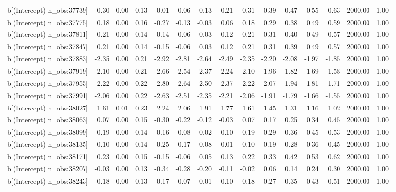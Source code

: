 \begin{table}[ht]
\begin{tabular}{rrrrrrrrrrrrrrr}
  b[(Intercept) n\_obs:37739] & 0.30 & 0.00 & 0.13 & -0.01 & 0.06 & 0.13 & 0.21 & 0.31 & 0.39 & 0.47 & 0.55 & 0.63 & 2000.00 & 1.00 \\ 
  b[(Intercept) n\_obs:37775] & 0.18 & 0.00 & 0.16 & -0.27 & -0.13 & -0.03 & 0.06 & 0.18 & 0.29 & 0.38 & 0.49 & 0.59 & 2000.00 & 1.00 \\ 
  b[(Intercept) n\_obs:37811] & 0.21 & 0.00 & 0.14 & -0.14 & -0.06 & 0.03 & 0.12 & 0.21 & 0.31 & 0.40 & 0.49 & 0.57 & 2000.00 & 1.00 \\ 
  b[(Intercept) n\_obs:37847] & 0.21 & 0.00 & 0.14 & -0.15 & -0.06 & 0.03 & 0.12 & 0.21 & 0.31 & 0.39 & 0.49 & 0.57 & 2000.00 & 1.00 \\ 
  b[(Intercept) n\_obs:37883] & -2.35 & 0.00 & 0.21 & -2.92 & -2.81 & -2.64 & -2.49 & -2.35 & -2.20 & -2.08 & -1.97 & -1.85 & 2000.00 & 1.00 \\ 
  b[(Intercept) n\_obs:37919] & -2.10 & 0.00 & 0.21 & -2.66 & -2.54 & -2.37 & -2.24 & -2.10 & -1.96 & -1.82 & -1.69 & -1.58 & 2000.00 & 1.00 \\ 
  b[(Intercept) n\_obs:37955] & -2.22 & 0.00 & 0.22 & -2.80 & -2.64 & -2.50 & -2.37 & -2.22 & -2.07 & -1.94 & -1.81 & -1.71 & 2000.00 & 1.00 \\ 
  b[(Intercept) n\_obs:37991] & -2.06 & 0.00 & 0.22 & -2.63 & -2.51 & -2.35 & -2.21 & -2.06 & -1.91 & -1.79 & -1.66 & -1.55 & 2000.00 & 1.00 \\ 
  b[(Intercept) n\_obs:38027] & -1.61 & 0.01 & 0.23 & -2.24 & -2.06 & -1.91 & -1.77 & -1.61 & -1.45 & -1.31 & -1.16 & -1.02 & 2000.00 & 1.00 \\ 
  b[(Intercept) n\_obs:38063] & 0.07 & 0.00 & 0.15 & -0.30 & -0.22 & -0.12 & -0.03 & 0.07 & 0.17 & 0.25 & 0.34 & 0.45 & 2000.00 & 1.00 \\ 
  b[(Intercept) n\_obs:38099] & 0.19 & 0.00 & 0.14 & -0.16 & -0.08 & 0.02 & 0.10 & 0.19 & 0.29 & 0.36 & 0.45 & 0.53 & 2000.00 & 1.00 \\ 
  b[(Intercept) n\_obs:38135] & 0.10 & 0.00 & 0.14 & -0.25 & -0.17 & -0.08 & 0.01 & 0.10 & 0.19 & 0.28 & 0.36 & 0.45 & 2000.00 & 1.00 \\ 
  b[(Intercept) n\_obs:38171] & 0.23 & 0.00 & 0.15 & -0.15 & -0.06 & 0.05 & 0.13 & 0.22 & 0.33 & 0.42 & 0.53 & 0.62 & 2000.00 & 1.00 \\ 
  b[(Intercept) n\_obs:38207] & -0.03 & 0.00 & 0.13 & -0.34 & -0.28 & -0.20 & -0.11 & -0.02 & 0.06 & 0.14 & 0.24 & 0.30 & 2000.00 & 1.00 \\ 
  b[(Intercept) n\_obs:38243] & 0.18 & 0.00 & 0.13 & -0.17 & -0.07 & 0.01 & 0.10 & 0.18 & 0.27 & 0.35 & 0.43 & 0.51 & 2000.00 & 1.00 \\ 

\end{tabular}
\end{table}
